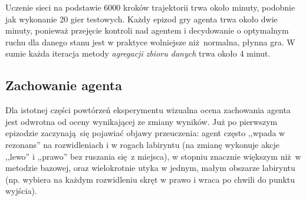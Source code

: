 Uczenie sieci na podstawie 6000 kroków trajektorii trwa około minuty, podobnie jak wykonanie 20 gier testowych. Każdy epizod gry agenta trwa około dwie minuty, ponieważ przejęcie kontroli nad agentem i decydowanie o optymalnym ruchu dla danego stanu jest w praktyce wolniejsze niż normalna, płynna gra. W sumie każda iteracja metody \textit{agregacji zbioru danych} trwa około 4 minut.

\begin{figure}[H]
\end{figure}

\begin{figure}[H]
\end{figure}

\subsection {Zachowanie agenta}
Dla istotnej części powtórzeń eksperymentu wizualna ocena zachowania agenta jest odwrotna od oceny wynikającej ze zmiany wyników. Już po pierwszym epizodzie zaczynają się pojawiać objawy przeuczenia: agent często ,,wpada w rezonans'' na rozwidleniach i w rogach labiryntu (na zmianę wykonuje akcje ,,lewo'' i ,,prawo'' bez ruszania się z miejsca), w stopniu znacznie większym niż w metodzie bazowej, oraz wielokrotnie utyka w jednym, małym obszarze labiryntu (np. wybiera na każdym rozwidleniu skręt w prawo i wraca po chwili do punktu wyjścia).

